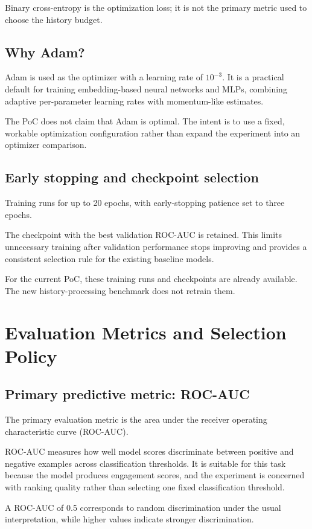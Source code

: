 \documentclass[11pt,a4paper]{article}
\begin{document}
Binary cross-entropy is the optimization loss; it is not the primary metric used to choose the history budget.

\subsection{Why Adam?}
Adam is used as the optimizer with a learning rate of $10^{-3}$. It is a practical default for training embedding-based neural networks and MLPs, combining adaptive per-parameter learning rates with momentum-like estimates.

The PoC does not claim that Adam is optimal. The intent is to use a fixed, workable optimization configuration rather than expand the experiment into an optimizer comparison.

\subsection{Early stopping and checkpoint selection}
Training runs for up to 20 epochs, with early-stopping patience set to three epochs.

The checkpoint with the best validation ROC-AUC is retained. This limits unnecessary training after validation performance stops improving and provides a consistent selection rule for the existing baseline models.

For the current PoC, these training runs and checkpoints are already available. The new history-processing benchmark does not retrain them.

\section{Evaluation Metrics and Selection Policy}
\subsection{Primary predictive metric: ROC-AUC}
The primary evaluation metric is the area under the receiver operating characteristic curve (ROC-AUC).

ROC-AUC measures how well model scores discriminate between positive and negative examples across classification thresholds. It is suitable for this task because the model produces engagement scores, and the experiment is concerned with ranking quality rather than selecting one fixed classification threshold.

A ROC-AUC of 0.5 corresponds to random discrimination under the usual interpretation, while higher values indicate stronger discrimination.
\end{document}
